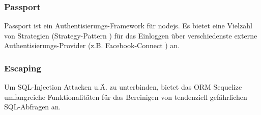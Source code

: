 \subsubsection*{Passport}
Passport \cite{Passportjs} ist ein Authentisierungs-Framework für \gls{nodejs}. Es bietet eine Vielzahl von Strategien (Strategy-Pattern \cite{StrategyPattern}) für das Einloggen über verschiedenste externe Authentisierungs-Provider (z.B. Facebook-Connect \cite{FacebookConnect}) an.

\subsubsection*{Escaping}
Um SQL-Injection \cite{sqlinjection} Attacken u.Ä. zu unterbinden, bietet das \gls{ORM} Sequelize \cite{Sequelize} umfangreiche Funktionalitäten für das Bereinigen von tendenziell gefährlichen \gls{SQL}-Abfragen an.